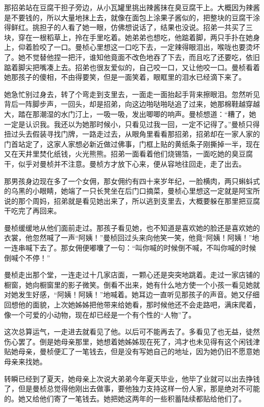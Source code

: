 \par 那招弟站在豆腐干担子旁边，从小瓦罐里挑出辣酱抹在臭豆腐干上。大概因为辣酱是不要钱的，所以大量地抹上去，就像在面包上涂果子酱似的，把整块的豆腐干涂得鲜红。挑担子的人看了她一眼，仿佛想说话了，结果也没说。招弟一共买了三块，穿在一根稻草上，拎在手里吃着。她弟弟也想吃，他踮着脚，两只手扑在她身上，仰着脸咬了一口。曼桢心里想这一口吃下去，一定辣得眼泪出，喉咙也要烫坏了。她不觉替他捏一把汗，谁知他竟面不改色地吞了下去，而且吃了还要吃，依旧踮着脚尖把嘴凑上去。招弟也很友爱似的，自己咬一口，又让他咬一口。曼桢看着她那孩子的傻相，不由得要笑，但是一面笑着，眼眶里的泪水已经滴下来了。
\par 她急忙别过身去，转了个弯走到支里去，一面走一面抬起手背来擦眼泪。忽然听见背后一阵脚步声，一回头，却是招弟，向这边啪哒啪哒追了过来，她那棉鞋越穿越大，踏在那潮湿的水门汀上，一吸一吸，发出唧唧的响声。曼桢想道：“糟了，她一定是认识我。我还以为她那时候小，只看见过我一回，一定不记得了。”曼桢只得扭过头去假装寻找门牌，一路走过去，从眼角里看看那招弟，招弟却在一家人家的门首站定了，这家人家想必新近做过佛事，门框上贴的黄纸条子刚撕掉一半，现在又在天井里焚化纸钱，火光熊熊。招弟一面看着他们烧锡箔，一面吃她的臭豆腐干，似乎对曼桢并不注意。曼桢方才放下心来，便从容地往回走，走了出去。
\par 那男孩身边现在多了一个女佣，那女佣约有四十来岁年纪，一脸横肉，两只蝌蚪式的乌黑的小眼睛，她端了一只长凳坐在后门口摘菜，曼桢心里想这一定就是阿宝所说的那个周妈，招弟就是看见她出来了，所以逃到支里去，大概要躲在那里把豆腐干吃完了再回来。
\par 曼桢缓缓地从他们面前走过。那孩子看见她，也不知道是喜欢她的脸还是喜欢她的衣裳，他忽然喊了一声“阿姨！”曼桢回过头来向他笑一笑，他竟“阿姨！阿姨！”地一连串喊下去了。那女佣便嘟囔了一句：“叫你喊的时候倒不喊，不叫你喊的时候倒喊个不停！”
\par 曼桢走出那个堂，一连走过十几家店面，一颗心还是突突地跳着。走过一家店铺的橱窗，她向橱窗里的影子微笑。倒看不出来，她有什么地方使一个小孩一看见她就对她发生好感，“阿姨！阿姨！”地喊着。她耳边一直听见那孩子的声音。她又仔细回想他的面貌，上次她姊姊把他带来给她看，那时候他还不会走路吧，满床爬着，像一个可爱的小动物，现在却已经是一个有个性的“人物”了。
\par 这次总算运气，一走进去就看见了他。以后可不能再去了。多看见了也无益，徒然伤心罢了。倒是她母亲那里，她想着她姊姊现在死了，鸿才也未见得有这个闲钱津贴她母亲，曼桢便汇了一笔钱去，但是没有写她自己的地址，因为她仍旧不愿意她母亲来找她。
\par 转瞬已经到了夏天，她母亲上次说大弟弟今年夏天毕业，他毕了业就可以出去挣钱了，但是曼桢总觉得他刚出去做事，要他独力支持这样一份人家，那是绝对不可能的。她又给他们寄了一笔钱去。她把她这两年的一些积蓄陆续都贴给他们了。
